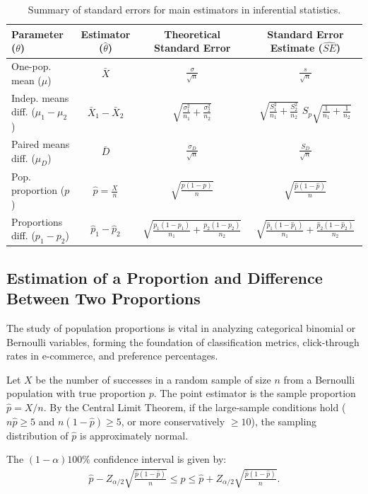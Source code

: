 \begin{table}[h!]
	\centering
	\begin{tabular}{lccc}
		\hline
		\textbf{Parameter ($\theta$)} & \textbf{Estimator ($\hat{\theta}$)} & \textbf{Theoretical Standard Error} & \textbf{Standard Error Estimate ($\widehat{SE}$)} \\ \hline
		One-pop. mean ($\mu$) & $\bar{X}$ & $\frac{\sigma}{\sqrt{n}}$ & $\frac{s}{\sqrt{n}}$ \\ [1.5ex]
		Indep. means diff. ($\mu_1 - \mu_2$) & $\bar{X}_1 - \bar{X}_2$ & $\sqrt{\frac{\sigma_1^2}{n_1} + \frac{\sigma_2^2}{n_2}}$ & $\sqrt{\frac{S_1^2}{n_1} + \frac{S_2^2}{n_2}}$ \text{ or } $S_p \sqrt{\frac{1}{n_1} + \frac{1}{n_2}}$ \\ [1.5ex]
		Paired means diff. ($\mu_D$) & $\bar{D}$ & $\frac{\sigma_D}{\sqrt{n}}$ & $\frac{S_D}{\sqrt{n}}$ \\ [1.5ex]
		Pop. proportion ($p$) & $\hat{p} = \frac{X}{n}$ & $\sqrt{\frac{p(1-p)}{n}}$ & $\sqrt{\frac{\hat{p}(1-\hat{p})}{n}}$ \\ [1.5ex]
		Proportions diff. ($p_1 - p_2$) & $\hat{p}_1 - \hat{p}_2$ & $\sqrt{\frac{p_1(1-p_1)}{n_1} + \frac{p_2(1-p_2)}{n_2}}$ & $\sqrt{\frac{\hat{p}_1(1-\hat{p}_1)}{n_1} + \frac{\hat{p}_2(1-\hat{p}_2)}{n_2}}$ \\ \hline
	\end{tabular}
	\caption{Summary of standard errors for main estimators in inferential statistics.}
	\label{tab:errores_estandar}
\end{table}

\subsection{Estimation of a Proportion and Difference Between Two Proportions}

The study of population proportions is vital in analyzing categorical binomial or Bernoulli variables, forming the foundation of classification metrics, click-through rates in e-commerce, and preference percentages.

\begin{teorema}
	Let $X$ be the number of successes in a random sample of size $n$ from a Bernoulli population with true proportion $p$. The point estimator is the sample proportion $\hat{p} = X/n$. By the Central Limit Theorem, if the large-sample conditions hold ($n\hat{p} \geq 5$ and $n(1-\hat{p}) \geq 5$, or more conservatively $\geq 10$), the sampling distribution of $\hat{p}$ is approximately normal.
	
	The $(1-\alpha)100\%$ confidence interval is given by:
	\begin{align}
		\hat{p} - Z_{\alpha/2} \sqrt{\frac{\hat{p}(1-\hat{p})}{n}} \leq p \leq \hat{p} + Z_{\alpha/2} \sqrt{\frac{\hat{p}(1-\hat{p})}{n}}.
	\end{align}
\end{teorema}

